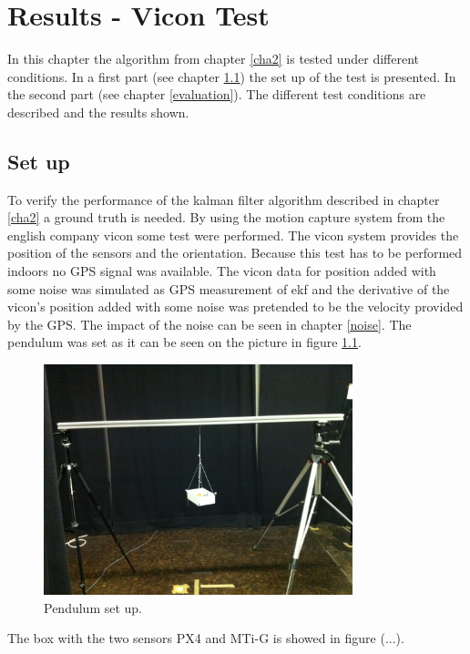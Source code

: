 \chapter{Results - Vicon Test}\label{cha4}
In this chapter the algorithm from chapter \ref{cha2} is tested under different conditions. In a first part (see chapter \ref{setup}) the set up of the test is presented. In the second part (see chapter \ref{evaluation}). The different test conditions are described and the results shown.
\section{Set up}\label{setup}
To verify the performance of the kalman filter algorithm described in chapter \ref{cha2} a ground truth is needed.  By using the motion capture system from the english company vicon some test were performed. The vicon system provides the position of the sensors and the orientation. Because this test has to be performed indoors no GPS signal was available. The vicon data for position added with some noise was simulated as GPS measurement of ekf and the derivative of the vicon's position added with some noise was pretended to be the velocity provided by the GPS. The impact of the noise can be seen in chapter \ref{noise}.
The pendulum was set as it can be seen on the picture in figure \ref{pend_setup}. 
\begin{figure}[h]
\centering
\includegraphics[width=0.8\textwidth]{vicon_bilder/IMG_0137.jpg}
\caption{Pendulum set up.}
\label{pend_setup}
\end{figure}
The box with the two sensors PX4 and MTi-G is showed in figure (...).

